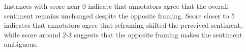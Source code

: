 Instances with score near 0 indicate that annotators agree that the overall sentiment remains unchanged despite the opposite framing. Score closer to 5 indicates that annotators agree that reframing shifted the perceived sentiment, while score around 2-3 suggests that the opposite framing makes the sentiment ambiguous.

